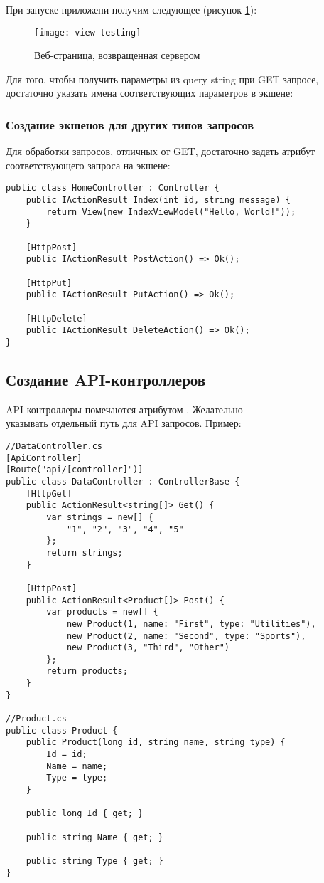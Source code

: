 \documentclass[a4paper,14pt]{extarticle}
\begin{document}
При запуске приложени получим следующее (рисунок \ref{fig:view-testing}):

\begin{figure}[H]
    \centering
    \texttt{[image: view-testing]}
    \caption{Веб-страница, возвращенная сервером}
    \label{fig:view-testing}
\end{figure}

Для того, чтобы получить параметры из query string при GET запросе, достаточно
указать имена соответствующих параметров в экшене:


\subsubsection{Создание экшенов для других типов запросов}
Для обработки запросов, отличных от GET, достаточно задать атрибут
соответствующего запроса на экшене:

\begin{lstlisting}
public class HomeController : Controller {
    public IActionResult Index(int id, string message) {
        return View(new IndexViewModel("Hello, World!"));
    }

    [HttpPost]
    public IActionResult PostAction() => Ok();

    [HttpPut]
    public IActionResult PutAction() => Ok();

    [HttpDelete]
    public IActionResult DeleteAction() => Ok();
}
\end{lstlisting}

\subsection{Создание API-контроллеров}

API-контроллеры помечаются атрибутом \code{[ApiController]}. Желательно\\указывать
отдельный путь для API запросов. Пример:

\begin{lstlisting}
//DataController.cs
[ApiController]
[Route("api/[controller]")]
public class DataController : ControllerBase {
    [HttpGet]
    public ActionResult<string[]> Get() {
        var strings = new[] {
            "1", "2", "3", "4", "5"
        };
        return strings;
    }

    [HttpPost]
    public ActionResult<Product[]> Post() {
        var products = new[] {
            new Product(1, name: "First", type: "Utilities"),
            new Product(2, name: "Second", type: "Sports"),
            new Product(3, "Third", "Other")
        };
        return products;
    }
}

//Product.cs
public class Product {
    public Product(long id, string name, string type) {
        Id = id;
        Name = name;
        Type = type;
    }

    public long Id { get; }

    public string Name { get; }

    public string Type { get; }
}
\end{lstlisting}
\end{document}
